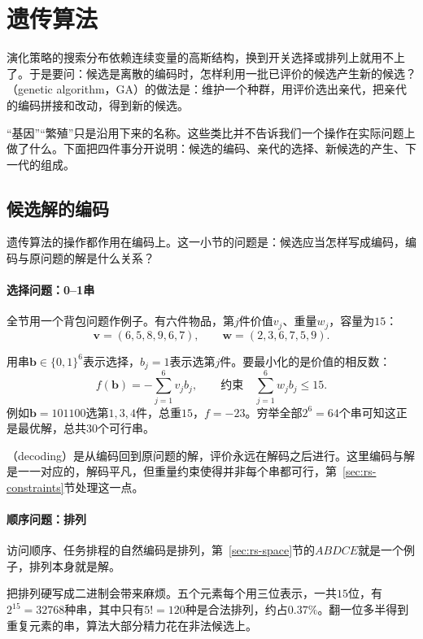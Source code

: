 \section{遗传算法}
\label{sec:rs-ga}

演化策略的搜索分布依赖连续变量的高斯结构，换到开关选择或排列上就用不上了。于是要问：候选是离散的编码时，怎样利用一批已评价的候选产生新的候选？（genetic algorithm，GA）的做法是：维护一个种群，用评价选出亲代，把亲代的编码拼接和改动，得到新的候选。

“基因”“繁殖”只是沿用下来的名称。这些类比并不告诉我们一个操作在实际问题上做了什么。下面把四件事分开说明：候选的编码、亲代的选择、新候选的产生、下一代的组成。

\subsection{候选解的编码}
\label{sec:rs-ga-encoding}

遗传算法的操作都作用在编码上。这一小节的问题是：候选应当怎样写成编码，编码与原问题的解是什么关系？

\paragraph{选择问题：0--1串}
全节用一个背包问题作例子。有六件物品，第$j$件价值$v_j$、重量$w_j$，容量为$15$：
\[
 \bm{v}=(6,5,8,9,6,7),\qquad\bm{w}=(2,3,6,7,5,9).
\]

用串$\bm{b}\in\{0,1\}^6$表示选择，$b_j=1$表示选第$j$件。要最小化的是价值的相反数：
\begin{equation}
 f(\bm{b})=-\sum_{j=1}^{6}v_jb_j,\qquad\text{约束}\quad\sum_{j=1}^{6}w_jb_j\leq15.
 \label{eq:rs-knapsack}
\end{equation}
例如$\bm{b}=101100$选第$1,3,4$件，总重$15$，$f=-23$。穷举全部$2^6=64$个串可知这正是最优解，总共$30$个可行串。

（decoding）是从编码回到原问题的解，评价永远在解码之后进行。这里编码与解是一一对应的，解码平凡，但重量约束使得并非每个串都可行，第~\ref{sec:rs-constraints}节处理这一点。

\paragraph{顺序问题：排列}
访问顺序、任务排程的自然编码是排列，第~\ref{sec:rs-space}节的$ABDCE$就是一个例子，排列本身就是解。

把排列硬写成二进制会带来麻烦。五个元素每个用三位表示，一共$15$位，有$2^{15}=32768$种串，其中只有$5!=120$种是合法排列，约占$0.37\%$。翻一位多半得到重复元素的串，算法大部分精力花在非法候选上。

